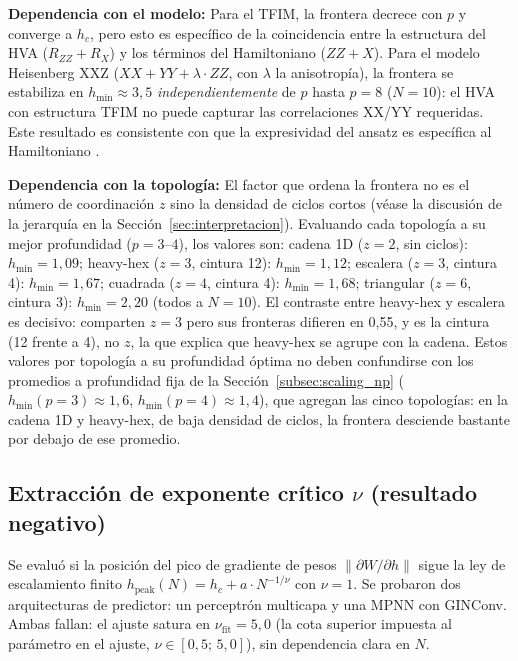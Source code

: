 \documentclass[11pt,a4paper,spanish]{book}
\begin{document}
\textbf{Dependencia con el modelo:} Para el TFIM, la frontera decrece con $p$ y converge a $h_c$, pero esto es específico de la coincidencia entre la estructura del HVA ($R_{ZZ} + R_X$) y los términos del Hamiltoniano ($ZZ + X$). Para el modelo Heisenberg XXZ ($XX + YY + \lambda \cdot ZZ$, con $\lambda$ la anisotropía), la frontera se estabiliza en $h_{\min} \approx 3,5$ \emph{independientemente} de $p$ hasta $p = 8$ ($N = 10$): el HVA con estructura TFIM no puede capturar las correlaciones XX/YY requeridas. Este resultado es consistente con que la expresividad del ansatz es específica al Hamiltoniano \citep{wiersema2020}.

\textbf{Dependencia con la topología:} El factor que ordena la frontera no es el número de coordinación $z$ sino la densidad de ciclos cortos (véase la discusión de la jerarquía en la Sección~\ref{sec:interpretacion}). Evaluando cada topología a su mejor profundidad ($p = 3$--$4$), los valores son: cadena 1D ($z = 2$, sin ciclos): $h_{\min} = 1,09$; heavy-hex ($z = 3$, cintura 12): $h_{\min} = 1,12$; escalera ($z = 3$, cintura 4): $h_{\min} = 1,67$; cuadrada ($z = 4$, cintura 4): $h_{\min} = 1,68$; triangular ($z = 6$, cintura 3): $h_{\min} = 2,20$ (todos a $N = 10$). El contraste entre heavy-hex y escalera es decisivo: comparten $z = 3$ pero sus fronteras difieren en 0,55, y es la cintura (12 frente a 4), no $z$, la que explica que heavy-hex se agrupe con la cadena. Estos valores por topología a su profundidad óptima no deben confundirse con los promedios a profundidad fija de la Sección~\ref{subsec:scaling_np} ($h_{\min}(p{=}3) \approx 1,6$, $h_{\min}(p{=}4) \approx 1,4$), que agregan las cinco topologías: en la cadena 1D y heavy-hex, de baja densidad de ciclos, la frontera desciende bastante por debajo de ese promedio.

\subsection{Extracción de exponente crítico $\nu$ (resultado negativo)}

Se evaluó si la posición del pico de gradiente de pesos $\|\partial W / \partial h\|$ sigue la ley de escalamiento finito $h_{\text{peak}}(N) = h_c + a \cdot N^{-1/\nu}$ con $\nu = 1$. Se probaron dos arquitecturas de predictor: un perceptrón multicapa y una MPNN con GINConv. Ambas fallan: el ajuste satura en $\nu_{\text{fit}} = 5,0$ (la cota superior impuesta al parámetro en el ajuste, $\nu \in [0{,}5;\, 5{,}0]$), sin dependencia clara en $N$.
\end{document}

